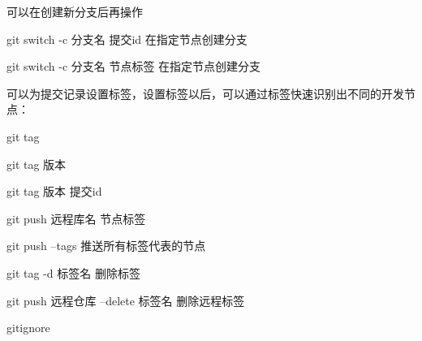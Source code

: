         可以在创建新分支后再操作

        git switch -c 分支名  提交id   在指定节点创建分支

        git switch -c 分支名  节点标签  在指定节点创建分支

        可以为提交记录设置标签，设置标签以后，可以通过标签快速识别出不同的开发节点：

        git tag

        git tag 版本

        git tag 版本 提交id

        git push 远程库名 节点标签

        git push --tags     推送所有标签代表的节点

        git tag -d 标签名   删除标签

        git push 远程仓库 --delete 标签名   删除远程标签

        gitignore

        
        




            